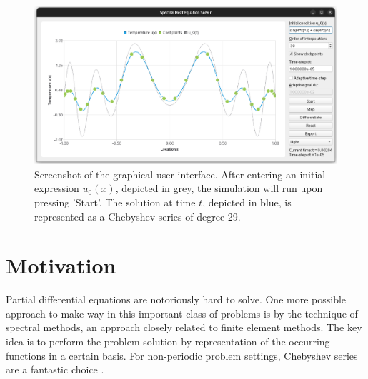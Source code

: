 \documentclass[12pt, a4paper]{article}
\newcommand{\chebyshev}{Chebyshev\xspace}
\begin{document}
  \begin{figure}[H]
    \centering
    \includegraphics[width=\linewidth]{figures/screenshot.png}
    \caption{Screenshot of the graphical user interface. After entering an initial expression $u_0(x)$, depicted in grey, the simulation will run upon pressing 'Start'. The solution at time $t$, depicted in blue, is represented as a \chebyshev series of degree 29.}
  \end{figure}

  \pagebreak
  \pagestyle{normal}


  \section{Motivation}
  Partial differential equations are notoriously hard to solve. One more possible approach to make way in this important class of problems is by the technique of spectral methods, an approach closely related to finite element methods.
  The key idea is to perform the problem solution by representation of the occurring functions in a certain basis.
  For non-periodic problem settings, \chebyshev series are a fantastic choice \parencite{Boyd1989ChebyshevAF}.
\end{document}
